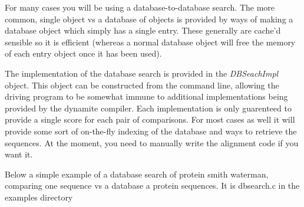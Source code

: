 For many cases you will be using a database-to-database search. The
more common, single object vs a database of objects is provided by
ways of making a database object which simply has a single
entry. These generally are cache'd sensible so it is efficient
(whereas a normal database object will free the memory of each entry
object once it has been used).

The implementation of the database search is provided in the
\emph{DBSeachImpl} object. This object can be constructed from the
command line, allowing the driving program to be somewhat immune to
additional implementations being provided by the dynamite
compiler. Each implementation is only guarenteed to provide a single
score for each pair of comparisons. For most cases as well it will
provide some sort of on-the-fly indexing of the database and ways to
retrieve the sequences. At the moment, you need to manually write the
alignment code if you want it.

Below a simple example of a database search of protein smith waterman,
comparing one sequence vs a database a protein sequences. It is
dbsearch.c in the examples directory

